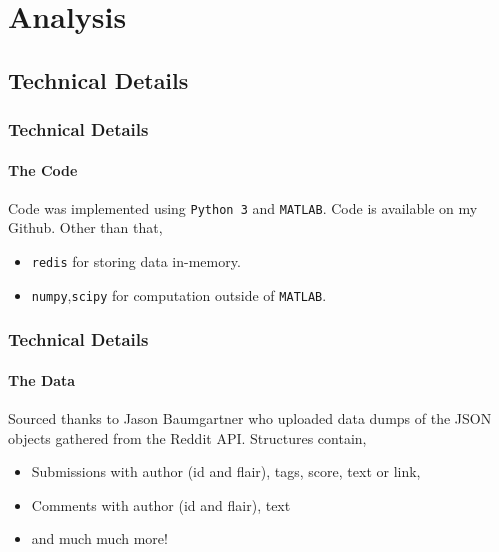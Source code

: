 \documentclass[frame number]{beamer}
\begin{document}
\section{Analysis}
\subsection{Technical Details}
\begin{frame}
  \frametitle{Technical Details}
  \framesubtitle{The Code}
  Code was implemented using \texttt{Python 3} and \texttt{MATLAB}. Code is available on my Github. Other than that,
  \begin{itemize}
    \item \texttt{redis} for storing data in-memory.
    \item \texttt{numpy},\texttt{scipy} for computation outside of \texttt{MATLAB}.
  \end{itemize}
\end{frame}
\begin{frame}
  \frametitle{Technical Details}
  \framesubtitle{The Data}
  Sourced thanks to Jason Baumgartner who uploaded data dumps of the JSON objects gathered from the Reddit API. Structures contain,
  \begin{itemize}
    \item Submissions with author (id and flair), tags, score, text or link,
    \item Comments with author (id and flair), text
    \item and much much more!
  \end{itemize}
\end{frame}
\end{document}

